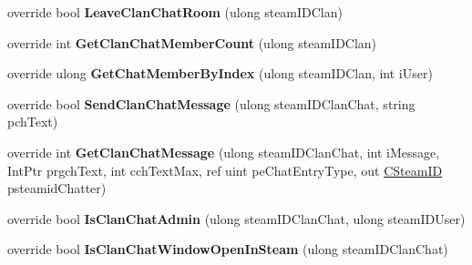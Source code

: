 \begin{DoxyCompactItemize}
\item 
\mbox{\label{class_valve_1_1_steamworks_1_1_c_steam_friends_a1d34a30bc35f2245add368e5f9d94378}} 
override bool {\bfseries Leave\+Clan\+Chat\+Room} (ulong steam\+I\+D\+Clan)
\item 
\mbox{\label{class_valve_1_1_steamworks_1_1_c_steam_friends_a9d6fae677e35ea037d79ab712c0cc5b0}} 
override int {\bfseries Get\+Clan\+Chat\+Member\+Count} (ulong steam\+I\+D\+Clan)
\item 
\mbox{\label{class_valve_1_1_steamworks_1_1_c_steam_friends_a6de22c47b70a430a1217e3d5fb35c23d}} 
override ulong {\bfseries Get\+Chat\+Member\+By\+Index} (ulong steam\+I\+D\+Clan, int i\+User)
\item 
\mbox{\label{class_valve_1_1_steamworks_1_1_c_steam_friends_a6c89a26b80c3a252d2aa8d61e0e7336e}} 
override bool {\bfseries Send\+Clan\+Chat\+Message} (ulong steam\+I\+D\+Clan\+Chat, string pch\+Text)
\item 
\mbox{\label{class_valve_1_1_steamworks_1_1_c_steam_friends_aefbfbb7288a89ada5166a026f7d74961}} 
override int {\bfseries Get\+Clan\+Chat\+Message} (ulong steam\+I\+D\+Clan\+Chat, int i\+Message, Int\+Ptr prgch\+Text, int cch\+Text\+Max, ref uint pe\+Chat\+Entry\+Type, out \hyperlink{struct_valve_1_1_steamworks_1_1_c_steam_i_d}{C\+Steam\+ID} psteamid\+Chatter)
\item 
\mbox{\label{class_valve_1_1_steamworks_1_1_c_steam_friends_ad3cc44120461b8c3ca3803500b470a8c}} 
override bool {\bfseries Is\+Clan\+Chat\+Admin} (ulong steam\+I\+D\+Clan\+Chat, ulong steam\+I\+D\+User)
\item 
\mbox{\label{class_valve_1_1_steamworks_1_1_c_steam_friends_ae8491a749794ad77e3322a1c7261d14c}} 
override bool {\bfseries Is\+Clan\+Chat\+Window\+Open\+In\+Steam} (ulong steam\+I\+D\+Clan\+Chat)
\item 
\mbox{\label{class_valve_1_1_steamworks_1_1_c_steam_friends_a773bee54c69fd287180ff4e404b9e00f}} 

\end{DoxyCompactItemize}
